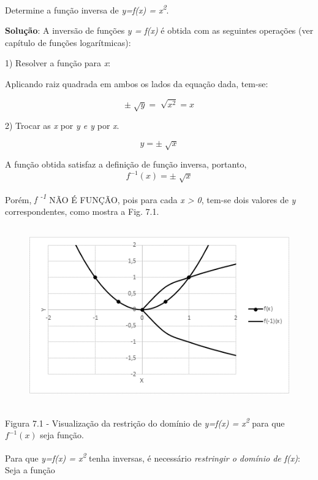 \begin{texemplo}
Determine a função inversa de \textit{y=f(x) = x\textsuperscript{2}}.

\textbf{Solução}: A inversão de funções \textit{y = f(x)} é obtida com as seguintes operações (ver capítulo de funções logarítmicas):

1\degree) Resolver a função para \textit{x}:

Aplicando raiz quadrada em ambos os lados da equação dada, tem-se:

 \[  \pm \sqrt[]{y}=\sqrt[]{x^{2}}=x \]

2\degree) Trocar as \textit{x }por\textit{ y e y }por\textit{ x}.

 \[ y= \pm \sqrt[]{x} \]

A função obtida satisfaz a definição de função inversa, portanto,  \(  \)  \[ f^{-1} \left( x \right) = \pm \sqrt[]{x} \]

Porém, \textit{f \textsuperscript{-1}} NÃO É FUNÇÃO, pois para cada \textit{x > 0}, tem-se dois valores de \textit{y} correspondentes, como mostra a Fig. 7.1.

\begin{figure}[H]
    \begin{Center}
        \includegraphics[width=5.0in,height=3.01in]{capitulos/trigonometria_e_funcoes_trigonometricas/media/image45.png}
    \end{Center}
\end{figure}

Figura 7.1 - Visualização da restrição do domínio de \textit{y=f(x) = x\textsuperscript{2}}  para que      \( f^{-1} \left( x \right)  \)  seja função. \(  \)

Para que \textit{y=f(x) = x\textsuperscript{2} } tenha inversas, é necessário \textit{restringir o domínio de f(x)}: Seja a função


\end{texemplo}
